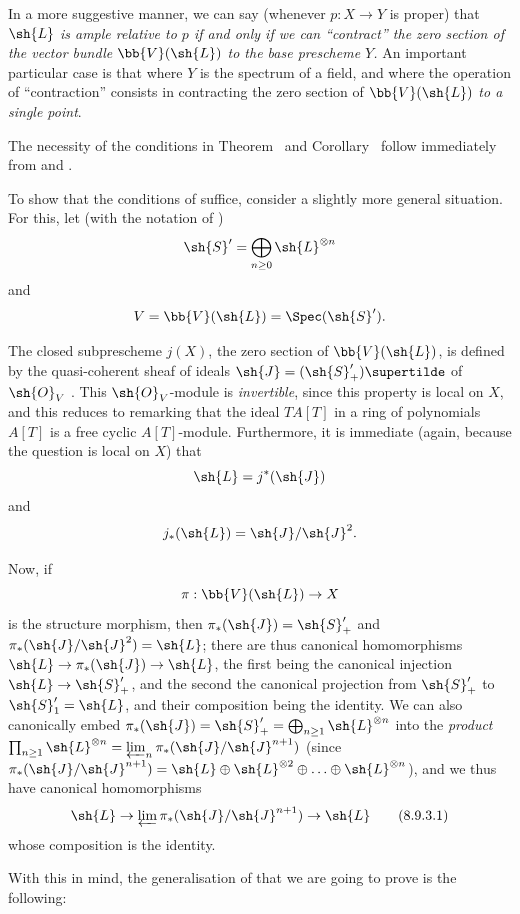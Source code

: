 In a more suggestive manner, we can say (whenever $p:X\to Y$ is proper) that \emph{$\sh{L}$ is ample relative to $p$ if and only if we can ``\emph{contract}'' the zero section of the vector bundle $\bb{V}(\sh{L})$ to the base prescheme $Y$.}
An important particular case is that where $Y$ is the spectrum of a field, and where the operation of ``contraction'' consists in contracting the zero section of $\bb{V}(\sh{L})$ \emph{to a single point}.

\begin{env}[8.9.3]
\label{II.8.9.3}
The necessity of the conditions in Theorem~ and Corollary~ follow immediately from  and .

To show that the conditions of  suffice, consider a slightly more general situation.
For this, let (with the notation of )
\[
  \sh{S}'=\bigoplus_{n\geq 0}\sh{L}^{\otimes n}
\]
and
\[
  V=\bb{V}(\sh{L})=\Spec(\sh{S}').
\]

The closed subprescheme $j(X)$, the zero section of $\bb{V}(\sh{L})$, is defined by the quasi-coherent sheaf of ideals $\sh{J}=(\sh{S}'_+)\supertilde$ of $\sh{O}_V$ .
This $\sh{O}_V$-module is \emph{invertible}, since this property is local on $X$, and this reduces to remarking that the ideal $TA[T]$ in a ring of polynomials $A[T]$ is a free cyclic $A[T]$-module.
Furthermore, it is immediate (again, because the question is local on $X$) that
\[
  \sh{L}=j^*(\sh{J})
\]
and
\[
  j_*(\sh{L})=\sh{J}/\sh{J}^2.
\]

Now, if
\[
  \pi:\bb{V}(\sh{L})\to X
\]
is the structure morphism, then $\pi_*(\sh{J})=\sh{S}'_+$ and $\pi_*(\sh{J}/\sh{J}^2)=\sh{L}$;
there are thus canonical homomorphisms $\sh{L}\to\pi_*(\sh{J})\to\sh{L}$, the first being the canonical injection $\sh{L}\to\sh{S}'_+$, and the second the canonical projection from $\sh{S}'_+$ to $\sh{S}'_1=\sh{L}$, and their composition being the identity.
We can also canonically embed $\pi_*(\sh{J}) = \sh{S}'_+ = \bigoplus_{n\geq1}\sh{L}^{\otimes n}$ into the \emph{product} $\prod_{n\geq1}\sh{L}^{\otimes n} = \varprojlim_n \pi_*(\sh{J}/\sh{J}^{n+1})$ (since $\pi_*(\sh{J}/\sh{J}^{n+1}) = \sh{L}\oplus\sh{L}^{\otimes 2}\oplus\ldots\oplus\sh{L}^{\otimes n}$), and we thus have canonical homomorphisms
\[
\label{II.8.9.3.1}
  \sh{L}\to\varprojlim\pi_*(\sh{J}/\sh{J}^{n+1})\to\sh{L}
  \tag{8.9.3.1}
\]
whose composition is the identity.

With this in mind, the generalisation of  that we are going to prove is the following:
\end{env}

